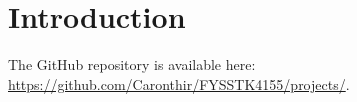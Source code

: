 \section{Introduction}

The GitHub repository is available here: \url{https://github.com/Caronthir/FYSSTK4155/projects/}.
